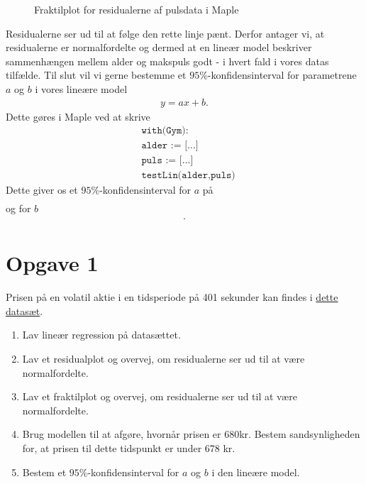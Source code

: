 \begin{exa}
\begin{figure}[H]
		\caption{Fraktilplot for residualerne af pulsdata i Maple}
		\label{fig:qqplot}
	\end{figure}
	Residualerne ser ud til at følge den rette linje pænt. Derfor antager vi, at residualerne er normalfordelte og dermed at en lineær model beskriver sammenhængen mellem alder
	og makspuls godt - i hvert fald i vores datas tilfælde. 
	Til slut vil vi gerne bestemme et $95\%$-konfidensinterval for parametrene $a$ og $b$ i vores lineære model 
	\begin{align*}
		y = ax + b.
	\end{align*}		
	Dette gøres i Maple ved at skrive 
	\begin{align*}
		&\texttt{with(Gym):}\\
		&\texttt{alder := [...]}\\
		&\texttt{puls := [...]}\\
		&\texttt{testLin(alder,puls)}
	\end{align*}
	Dette giver os et $95\%$-konfidensinterval for $a$ på
	\begin{align*}
		[-1.00216,-0.95978]
	\end{align*}
	og for $b$
	\begin{align*}
		[218.75654,220.64216].
	\end{align*}
	
\end{exa}

\section*{Opgave 1}

Prisen på en volatil aktie i en tidsperiode på 401 sekunder kan findes i \href{https://github.com/ChristianJLex/TeachingNotes/raw/master/2022-2023/Data%20og%20lign/Aktiepris.xlsx}{\color{blue!60} dette datasæt}.
\begin{enumerate}[label=\roman*)]
	\item Lav lineær regression på datasættet.
	\item Lav et residualplot og overvej, om residualerne ser ud til at være normalfordelte.
	\item Lav et fraktilplot og overvej, om residualerne ser ud til at være normalfordelte. 
	\item Brug modellen til at afgøre, hvornår prisen er 680kr. Bestem sandsynligheden for, at prisen til dette tidspunkt er under 678 kr. 
	\item Bestem et $95\%$-konfidensinterval for $a$ og $b$ i den lineære model. 
\end{enumerate}

